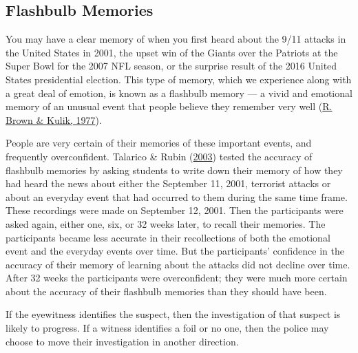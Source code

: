 \documentclass[
]{krantz}
\begin{document}
\hypertarget{flashbulb-memories}{%
\subsection*{Flashbulb Memories}\label{flashbulb-memories}}


You may have a clear memory of when you first heard about the 9/11 attacks in the United States in 2001, the upset win of the Giants over the Patriots at the Super Bowl for the 2007 NFL season, or the surprise result of the 2016 United States presidential election. This type of memory, which we experience along with a great deal of emotion, is known as a flashbulb memory --- a vivid and emotional memory of an unusual event that people believe they remember very well (\protect\hyperlink{ref-brown1977flashbulb}{R. Brown \& Kulik, 1977}).

People are very certain of their memories of these important events, and frequently overconfident. Talarico \& Rubin (\protect\hyperlink{ref-talarico2003confidence}{2003}) tested the accuracy of flashbulb memories by asking students to write down their memory of how they had heard the news about either the September 11, 2001, terrorist attacks or about an everyday event that had occurred to them during the same time frame. These recordings were made on September 12, 2001. Then the participants were asked again, either one, six, or 32 weeks later, to recall their memories. The participants became less accurate in their recollections of both the emotional event and the everyday events over time. But the participants' confidence in the accuracy of their memory of learning about the attacks did not decline over time. After 32 weeks the participants were overconfident; they were much more certain about the accuracy of their flashbulb memories than they should have been.

If the eyewitness identifies the suspect, then the investigation of that suspect is likely to progress. If a witness identifies a foil or no one, then the police may choose to move their investigation in another direction.
\end{document}
